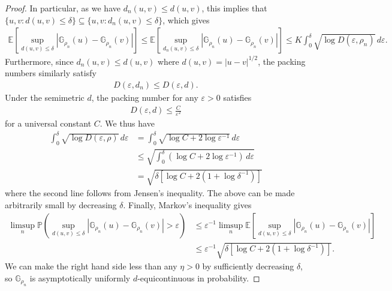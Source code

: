 \documentclass[11pt,a4paper]{article}
\newcommand{\E}{\mathbb{E}}
\renewcommand{\Pr}{\mathbb{P}}
\begin{document}
\begin{appendices}
\begin{proof}
In particular, as we have $d_n(u,v) \leq d(u,v)$, this implies
that $\{u,v:d(u,v) \leq \delta\}\subseteq \{u,v:d_n(u,v) \leq \delta\}$, which gives
\begin{align*}
    \E\left[\sup_{d(u,v)\leq \delta}|\mathbb{G}_{\rho_n}(u)-\mathbb{G}_{\rho_n}(v)|\right] \leq     \E\left[\sup_{d_n(u,v)\leq \delta}|\mathbb{G}_{\rho_n}(u)-\mathbb{G}_{\rho_n}(v)|\right] \leq K \int_0^{\delta} \sqrt{\log D(\varepsilon,\rho_n)}\, d\varepsilon.
\end{align*}
Furthermore, since $d_n(u,v)\leq d(u,v)$ where $d(u,v) = |u-v|^{1/2}$, the packing numbers similarly satisfy
\begin{align*}
    D(\varepsilon, d_n)\leq D(\varepsilon, d). 
\end{align*}
Under the semimetric $d$, the packing number for any $\varepsilon > 0$ satisfies
\begin{align*}
    D(\varepsilon,d) \leq \frac{C}{\varepsilon^2}
\end{align*}
for a universal constant $C$. We thus have
\begin{align*}
    \int_0^{\delta} \sqrt{\log D(\varepsilon,\rho)}\, d\varepsilon &=\int_0^\delta \sqrt{\log C + 2\log \varepsilon^{-1}} \, d\varepsilon\\
    &\leq \sqrt{\int_0^\delta(\log C + 2\log \varepsilon^{-1})\, d\varepsilon} \\
    &= \sqrt{\delta \left[\log C + 2(1 + \log \delta^{-1})\right] }
\end{align*}
where the second line follows from Jensen's inequality. The above can be made arbitrarily small by decreasing $\delta$. Finally, Markov's inequality gives
\begin{align*}
    \limsup_n \Pr\left(\sup_{d(u,v) \leq \delta}|\mathbb{G}_{\rho_n}(u)-\mathbb{G}_{\rho_n}(v)|> \varepsilon\right) &\leq \varepsilon^{-1}\limsup_n \E\left[\sup_{d(u,v) \leq \delta}|\mathbb{G}_{\rho_n}(u)-\mathbb{G}_{\rho_n}(v)|\right]\\
    &\leq \varepsilon^{-1}\sqrt{\delta \left[\log C + 2(1 + \log \delta^{-1})\right] }.
\end{align*}
We can make the right hand side less than any $\eta>0$ by sufficiently decreasing $\delta$, so $\mathbb{G}_{\rho_n}$ is asymptotically uniformly $d$-equicontinuous in probability. 


\end{proof}
\end{appendices}
\end{document}
